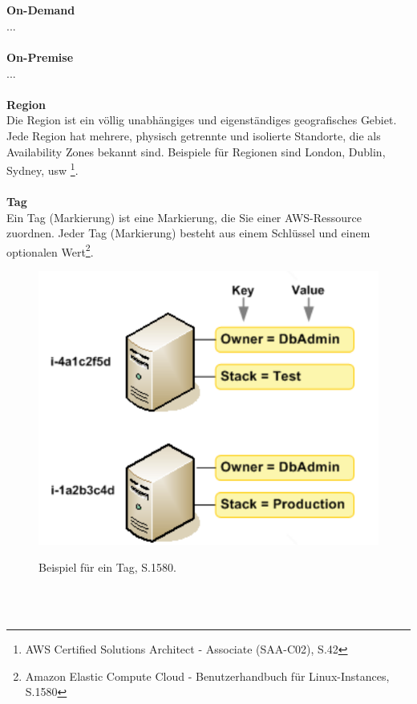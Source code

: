 \\\\
\textbf{On-Demand}\\
...
\\\\
\textbf{On-Premise}\\
...
\\\\
\textbf{Region}\\
Die Region ist ein völlig unabhängiges und eigenständiges geografisches Gebiet. Jede Region hat mehrere, physisch getrennte und isolierte Standorte, die als Availability Zones bekannt sind. Beispiele für Regionen sind London, Dublin, Sydney, usw \footnote{AWS Certified Solutions Architect - Associate (SAA-C02)\cite{AWS1}, S.42}.
\\\\
\textbf{Tag}\\
Ein Tag (Markierung) ist eine Markierung, die Sie einer AWS-Ressource zuordnen. Jeder Tag (Markierung) besteht aus einem Schlüssel und einem optionalen Wert\footnote{Amazon Elastic Compute Cloud - Benutzerhandbuch für Linux-Instances\cite{AMZ26}, S.1580}.
\begin{figure}[h!]
  \centering
  \includegraphics[scale=0.4]{sources/TagExample}
  \caption[Beispiel für ein Tag]{}\label{fig:TagExample}
Beispiel für ein Tag{\cite{AMZ26}, S.1580}.
\end{figure}
\\\\
